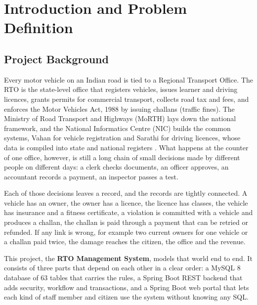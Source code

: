 \chapter{Introduction and Problem Definition}\label{ch:intro}

\section{Project Background}
Every motor vehicle on an Indian road is tied to a Regional Transport Office. The RTO
is the state-level office that registers vehicles, issues learner and driving
licences, grants permits for commercial transport, collects road tax and fees, and
enforces the Motor Vehicles Act, 1988 by issuing challans (traffic fines). The Ministry
of Road Transport and Highways (MoRTH) lays down the national framework, and the
National Informatics Centre (NIC) builds the common systems, Vahan for vehicle
registration and Sarathi for driving licences, whose data is compiled into state and
national registers \cite{parivahan-about}. What happens at the counter of one office,
however, is still a long chain of small decisions made by different people on
different days: a clerk checks documents, an officer approves, an accountant records
a payment, an inspector passes a test.

Each of those decisions leaves a record, and the records are tightly connected. A
vehicle has an owner, the owner has a licence, the licence has classes, the vehicle
has insurance and a fitness certificate, a violation is committed with a vehicle and
produces a challan, the challan is paid through a payment that can be retried or
refunded. If any link is wrong, for example two current owners for one vehicle or a
challan paid twice, the damage reaches the citizen, the office and the revenue.

This project, the \textbf{RTO Management System}, models that world end to end. It
consists of three parts that depend on each other in a clear order: a MySQL 8 database
of 63 tables that carries the rules, a Spring Boot REST backend that adds security,
workflow and transactions, and a Spring Boot web portal that lets each kind of staff
member and citizen use the system without knowing any SQL.

